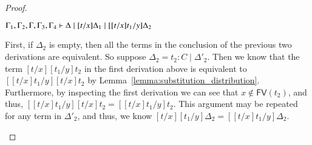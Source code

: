 \documentclass{elsarticle}
\newcommand{\FILLnt}[1]{\mathit{#1}}
\newcommand{\FILLmv}[1]{\mathit{#1}}
\newcommand{\FILLsym}[1]{#1}
\begin{document}
\begin{proof}
\begin{report}
\begin{itemize}
\begin{center}
\begin{math}
$${    }{ \Gamma_{{\mathrm{1}}}  \FILLsym{,}  \Gamma_{{\mathrm{2}}}  \FILLsym{,}  \Gamma  \FILLsym{,}  \Gamma_{{\mathrm{3}}}  \FILLsym{,}  \Gamma_{{\mathrm{4}}}  \vdash     \Delta  \mid  \FILLsym{[}  \FILLnt{t}  \FILLsym{/}  \FILLmv{x}  \FILLsym{]}  \Delta_{{\mathrm{1}}}    \mid  \FILLsym{[}  \FILLsym{[}  \FILLnt{t}  \FILLsym{/}  \FILLmv{x}  \FILLsym{]}  \FILLnt{t_{{\mathrm{1}}}}  \FILLsym{/}  \FILLmv{y}  \FILLsym{]}  \Delta_{{\mathrm{2}}}  }
  \end{math}
\end{center}
First, if $\Delta_{{\mathrm{2}}}$ is empty, then all the terms in the conclusion of
the previous two derivations are equivalent.  
So suppose $\Delta_{{\mathrm{2}}} =  \FILLnt{t_{{\mathrm{2}}}}  \FILLsym{:}  \FILLnt{C}  \mid  \Delta'_{{\mathrm{2}}} $.  Then we know that the term
$\FILLsym{[}  \FILLnt{t}  \FILLsym{/}  \FILLmv{x}  \FILLsym{]}  \FILLsym{[}  \FILLnt{t_{{\mathrm{1}}}}  \FILLsym{/}  \FILLmv{y}  \FILLsym{]}  \FILLnt{t_{{\mathrm{2}}}}$ in the first derivation above is equivalent to
$\FILLsym{[}  \FILLsym{[}  \FILLnt{t}  \FILLsym{/}  \FILLmv{x}  \FILLsym{]}  \FILLnt{t_{{\mathrm{1}}}}  \FILLsym{/}  \FILLmv{y}  \FILLsym{]}  \FILLsym{[}  \FILLnt{t}  \FILLsym{/}  \FILLmv{x}  \FILLsym{]}  \FILLnt{t_{{\mathrm{2}}}}$ by
Lemma~\ref{lemma:substitution_distribution}.  Furthermore, by
inspecting the first derivation we can see that $ \FILLmv{x}  \not\in \mathsf{FV}(  \FILLnt{t_{{\mathrm{2}}}}  ) $,
and thus, $\FILLsym{[}  \FILLsym{[}  \FILLnt{t}  \FILLsym{/}  \FILLmv{x}  \FILLsym{]}  \FILLnt{t_{{\mathrm{1}}}}  \FILLsym{/}  \FILLmv{y}  \FILLsym{]}  \FILLsym{[}  \FILLnt{t}  \FILLsym{/}  \FILLmv{x}  \FILLsym{]}  \FILLnt{t_{{\mathrm{2}}}}  \FILLsym{=}  \FILLsym{[}  \FILLsym{[}  \FILLnt{t}  \FILLsym{/}  \FILLmv{x}  \FILLsym{]}  \FILLnt{t_{{\mathrm{1}}}}  \FILLsym{/}  \FILLmv{y}  \FILLsym{]}  \FILLnt{t_{{\mathrm{2}}}}$.  This
argument may be repeated for any term in $\Delta'_{{\mathrm{2}}}$, and thus, we know
$\FILLsym{[}  \FILLnt{t}  \FILLsym{/}  \FILLmv{x}  \FILLsym{]}  \FILLsym{[}  \FILLnt{t_{{\mathrm{1}}}}  \FILLsym{/}  \FILLmv{y}  \FILLsym{]}  \Delta_{{\mathrm{2}}}  \FILLsym{=}  \FILLsym{[}  \FILLsym{[}  \FILLnt{t}  \FILLsym{/}  \FILLmv{x}  \FILLsym{]}  \FILLnt{t_{{\mathrm{1}}}}  \FILLsym{/}  \FILLmv{y}  \FILLsym{]}  \Delta_{{\mathrm{2}}}$.


\end{itemize}
\end{report}
\end{proof}
\end{document}
